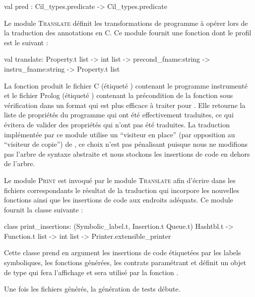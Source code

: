 \begin{ocamlcode}
val pred : Cil_types.predicate -> Cil_types.predicate
\end{ocamlcode}

Le module \textsc{Translate} définit les transformations de programme à opérer
lors de la traduction des annotations \eacsl en C.
Ce module fournit une fonction  dont le profil est le
suivant :

\begin{ocamlcode}
val translate:
  Property.t list ->
  int list ->
  precond_fname:string ->
  instru_fname:string ->
  Property.t list
\end{ocamlcode}

La fonction  produit le fichier C (étiqueté
) contenant le programme instrumenté et le fichier
Prolog (étiqueté ) contenant la précondition de la
fonction sous vérification dans un format qui est plus efficace à traiter pour
\pathcrawler.
Elle retourne la liste de propriétés du programme qui ont été effectivement
traduites, ce qui évitera de valider des propriétés qui n'ont pas été traduites.
La traduction implémentée par ce module utilise un ``visiteur en place'' (par
opposition au ``visiteur de copie'') de \framac
\cite[section 4.16]{frama-c-devman}, ce choix n'est pas pénalisant
puisque nous ne modifions pas l'arbre de syntaxe abstraite et nous stockons les
insertions de code en dehors de l'arbre.

Le module \textsc{Print} est invoqué par le module \textsc{Translate} afin
d'écrire dans les fichiers correspondants le résultat de la traduction qui
incorpore les nouvelles fonctions ainsi que les insertions de code aux endroits 
adéquats.
Ce module fournit la classe  suivante :

\begin{ocamlcode}
class print_insertions:
  (Symbolic_label.t, Insertion.t Queue.t) Hashtbl.t ->
  Function.t list ->
  int list ->
  Printer.extensible_printer
\end{ocamlcode}

Cette classe prend en argument les insertions de code étiquetées par les
labels symboliques, les fonctions générées, les contrats paramétrant \SWD et
définit un objet de type  qui fera l'affichage et sera
utilisé par la fonction .

Une fois les fichiers générés, la génération de tests débute.


